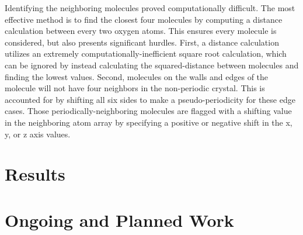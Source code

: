 Identifying the neighboring molecules proved computationally difficult. 
The most effective method is to find the closest four molecules by computing a distance calculation between every two oxygen atoms.
This ensures every molecule is considered, but also presents significant hurdles.
First, a distance calculation utilizes an extremely computationally-inefficient square root calculation, which can be ignored by instead calculating the squared-distance between molecules and finding the lowest values.
Second, molecules on the walls and edges of the molecule will not have four neighbors in the non-periodic crystal. 
This is accounted for by shifting all six sides to make a pseudo-periodicity for these edge cases. 
Those periodically-neighboring molecules are flagged with a shifting value in the neighboring atom array by specifying a positive or negative shift in the x, y, or z axis values. 

\section{Results}

\section{Ongoing and Planned Work}














